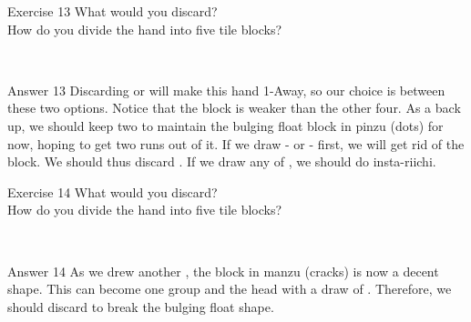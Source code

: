 \begin{itembox}[l]{Exercise 13}
What would you discard? \\
\vsp
How do you divide the hand into five tile blocks? 

\vspace{-30pt}
\bp
{}\\ \vspace{-16pt}
\rfw{}
\ep
\end{itembox}

\newpage

\begin{itembox}[r]{Answer 13}
\emj
Discarding {\LARGE{}} or {\LARGE{}} will make this hand 1-Away, so our choice is between these two options. Notice that the {\LARGE{}} block is weaker than the other four. As a back up, we should keep two {\LARGE{}} to maintain the bulging float block in {\jap pinzu} (dots) for now, hoping to get two runs out of it. If we draw {\LARGE{}-} or {\LARGE{}-} first, we will get rid of the {\LARGE{}} block. We should thus discard {\LARGE{}}. If we draw any of {\LARGE{}}, we should do insta-riichi. 
\end{itembox}

\vfill

\begin{itembox}[l]{Exercise 14}
What would you discard? \\
\vsp
How do you divide the hand into five tile blocks? 

\vspace{-30pt}
\bp
{}\\ \vspace{-16pt}
\rfw{}
\ep
\end{itembox}

\newpage

\begin{itembox}[r]{Answer 14}
\emj
As we drew another {\LARGE{}}, the block in {\jap manzu} (cracks) is now a decent shape. This can become one group and the head with a draw of {\LARGE{}   }. Therefore, we should discard  {\LARGE{}} to break the bulging float shape. 
\end{itembox}

